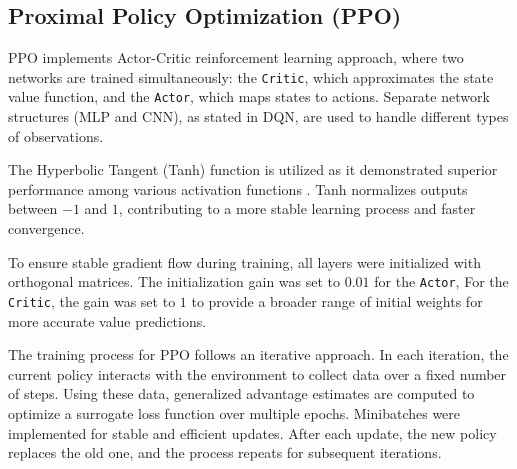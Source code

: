 \documentclass{article}
\begin{document}
\subsection{Proximal Policy Optimization (PPO)}

PPO implements Actor-Critic reinforcement learning approach\cite{konda_actor-critic_1999}, where two networks are trained simultaneously: the \texttt{Critic}, which approximates the state value function, and the \texttt{Actor}, which maps states to actions. Separate network structures (MLP and CNN), as stated in DQN, are used to handle different types of observations.



The Hyperbolic Tangent (Tanh) function is utilized as it demonstrated superior performance among various activation functions \cite{karlik_performance_nodate}. Tanh normalizes outputs between $-1$ and $1$, contributing to a more stable learning process and faster convergence.

To ensure stable gradient flow during training, all layers were initialized with orthogonal matrices. 
The initialization gain was set to $0.01$ for the \texttt{Actor},
For the \texttt{Critic}, the gain was set to $1$ to provide a broader range of initial weights for more accurate value predictions.

The training process for PPO follows an iterative approach\cite{schulman_proximal_2017}. In each iteration, the current policy interacts with the environment to collect data over a fixed number of steps. Using these data, generalized advantage estimates are computed to optimize a surrogate loss function over multiple epochs. Minibatches were implemented for stable and efficient updates. After each update, the new policy replaces the old one, and the process repeats for subsequent iterations. 

\end{document}
